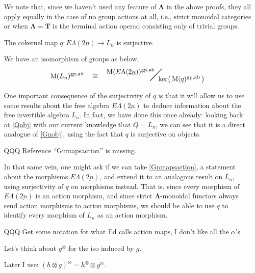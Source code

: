 \documentclass{amsbook} %
\newcommand{\mb}{\mathbf}
\newcommand{\ML}{\mathbf{\Lambda}}
\newcommand{\bigquotient}[2]{ \raisebox{0.75\height}{$#1$} \mkern-12mu\scalebox{2}{$\diagup$}\mkern-10mu \raisebox{-0.5\height}{$#2$} }
\newcommand{\EL}{E\Lambda}
\newcommand{\ELnn}{E\Lambda(\underline{2n})}
\numberwithin{section}{chapter}
\begin{document}
\begin{rem}\label{alsowithoutgroups}
We note that, since we haven't used any feature of $\ML$ in the above proofs, they all apply equally in the case of no group actions at all, i.e., strict monoidal categories or when $\ML = \mb{T}$ is the terminal action operad consisting only of trivial groups.
\end{rem}



\begin{cor}\label{qsurj} The cokernel map $q: \EL(\underline{2n}) \to L_n$ is surjective.
\end{cor}

\begin{cor}\label{M_coker}
We have an isomorphism of groups as below.
\[ \mathrm{M}(L_n)^{\mathrm{gp},\mathrm{ab}} \quad \cong \quad \bigquotient{\mathrm{M}(\ELnn)^{\mathrm{gp},\mathrm{ab}}}{\mathrm{ker}\big( \, \mathrm{M}(q)^{\mathrm{gp},\mathrm{ab}} \, \big)} \]
\end{cor}


One important consequence of the surjectivity of $q$ is that it will allow us to use some results about the free algebra $\ELnn$ to deduce information about the free invertible algebra $L_n$. In fact, we have done this once already: looking back at \cref{Qobj} with our current knowledge that $Q = L_n$, we can see that it is a direct analogue of \cref{Gnobj}, using the fact that $q$ is surjective on objects. 


QQQ Reference ``Gnmapsaction'' is missing.


In that same vein, one might ask if we can take \cref{Gnmapsaction}, a statement about the morphisms $\ELnn$, and extend it to an analagous result on $L_n$, using surjectivity of $q$ on morphisms instead. That is, since every morphism of $\ELnn$ is an action morphism, and since strict $\ML$-monoidal functors always send action morphisms to action morphisms, we should be able to use $q$ to identify every morphism of $L_n$ as an action morphism. 


QQQ Get some notation for what Ed calls action maps, I don't like all the $\alpha$'s

\begin{nota}\label{newaction}
Let's think about $g^{\otimes}$ for the iso induced by $g$.
\end{nota}

\begin{lem}\label{otimesotimes}
Later I use: $(h \otimes g)^{\otimes} = h^{\otimes} \otimes g^{\otimes}$.
\end{lem}
\end{document}
